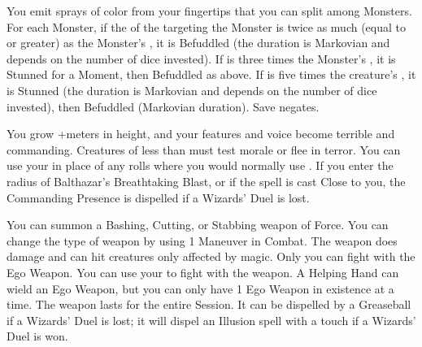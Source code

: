 {\SPELL[
  Name=Color Spray,
  Link=wizardry-color-spray,
  Paradigm=Mind,
  Save=Y (negate),
  Duration=0 / Markovian,
  Counter=n/a ,
  Keywords=Splittable,
  Target=Close or Nearby Monster(s)
]



You emit \DICE sprays of color from your fingertips that you can split among
\DICE Monsters.  For each Monster, if the \SUMDICE of the \DICE targeting
the Monster is twice as much (equal to or greater) as the Monster's \HD, it
is Befuddled (the duration is Markovian and depends on the number of dice
invested).  If \SUMDICE is three times the Monster's \HD, it is Stunned for
a Moment, then Befuddled as above. If \SUMDICE is five times the creature's
\HD, it is Stunned (the duration is Markovian and depends on the number of
dice invested), then Befuddled (Markovian duration).  Save negates.





\SPELL[
  Name=Commanding Presence,
  Link=wizardry-commanding-presence,
  Paradigm=Mind,
  Save=N,
  Duration=Combat or \SUMDICE Minutes,
  Counter=\mylink{Balthazar's Breathtaking Blast}{wizardry-balthazars-breathtaking-blast} ,
  Keywords=None,
  Target=Self
]



You grow +\DICE meters in height, and your features and voice become
terrible and commanding.  Creatures of less than \DICE \HD must test morale
or flee in terror.  You can use your \INT in place of any rolls where you
would normally use \VIG.  If you enter the radius of Balthazar's
Breathtaking Blast, or if the spell is cast Close to you, the Commanding
Presence is dispelled if a Wizards' Duel is lost.




\SPELL[
  Name=Ego Weapon,
  Link=wizardry-ego-weapon,
  Paradigm=Mind,
  Save=N,
  Duration=Session,
  Counter=\mylink{Greaseball}{wizardry-greaseball} ,
  Keywords=None,
  Target=Self
]



You can summon a Bashing, Cutting, or Stabbing weapon of Force.  You can
change the type of weapon by using 1 Maneuver in Combat.  The weapon does
\DICE damage and can hit creatures only affected by magic.  Only you can
fight with the Ego Weapon.   You can use your \INT to fight with the weapon. 
A Helping Hand can wield an Ego Weapon, but you can only have 1 Ego Weapon
in existence at a time.  The weapon lasts for the entire Session.  It can be
dispelled by a Greaseball if a Wizards' Duel is lost; it will dispel an
Illusion spell with a touch if a Wizards' Duel is won.





}
